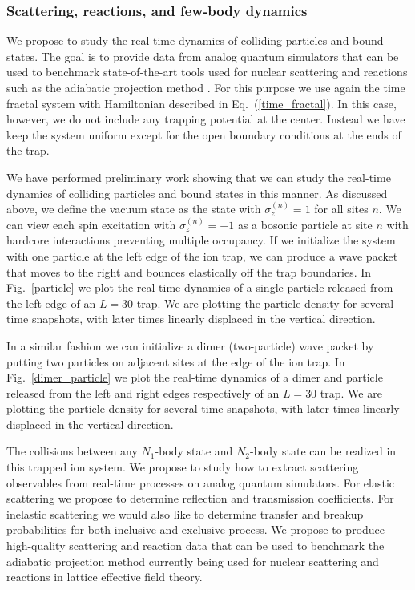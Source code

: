 \documentclass[aps,longbibliography,final,prl,onecolumn,superscriptaddress,nofootinbib,floatfix,11pt]{revtex4-1}
\begin{document}
\subsubsection{Scattering, reactions, and few-body dynamics}
We
propose to study
the real-time dynamics of colliding particles and bound states.  The goal is to provide data from analog quantum simulators that can be used to benchmark state-of-the-art tools used for nuclear scattering and reactions such as the adiabatic projection method \cite{Elhatisari:2015iga}.  For this purpose we use again the time fractal system with Hamiltonian described in Eq.~(\ref{time_fractal}).  In this case, however, we do not include any trapping potential at the center.  Instead we have keep the system uniform except for the open boundary conditions at the ends of the trap.

We have performed preliminary work showing that we can study
the real-time dynamics of colliding particles and bound states
in this manner.  As discussed above, we define the vacuum state as the state  with $\sigma_z^{(n)}=1$ for all
sites $n$.
We can view each spin
excitation  with $\sigma_z^{(n)}=-1$ as a bosonic particle
at site $n$ with hardcore interactions preventing multiple occupancy. If we initialize the system with one particle at the left edge of the ion trap, we can produce a wave packet that moves to the right and bounces elastically off the trap boundaries. In Fig.~\ref{particle} we plot the real-time dynamics of a single particle released from
the left edge of an $L=30$ trap.  We are plotting the particle density for
several time snapshots, with later times linearly displaced in the vertical
direction.

In a similar fashion we can initialize a dimer (two-particle) wave packet by putting two particles on adjacent sites at the edge of the ion trap. In Fig.~\ref{dimer_particle} we plot the real-time dynamics of a dimer and particle released from the left and right edges respectively of an $L=30$ trap.  We are plotting the particle density for
several time snapshots, with later times linearly displaced in the vertical
direction.
 

  The collisions between any $N_1$-body state and $N_2$-body state can be realized in this trapped ion system.  We propose to study how to extract scattering observables from real-time processes on analog quantum simulators.  For elastic scattering we propose to determine reflection and transmission coefficients.  For inelastic scattering we would also like to determine transfer and breakup probabilities for both inclusive and exclusive process. We propose to produce high-quality scattering
and reaction data that can be used to benchmark the adiabatic projection method currently being used for nuclear scattering and reactions in lattice effective field theory.  
\end{document}
